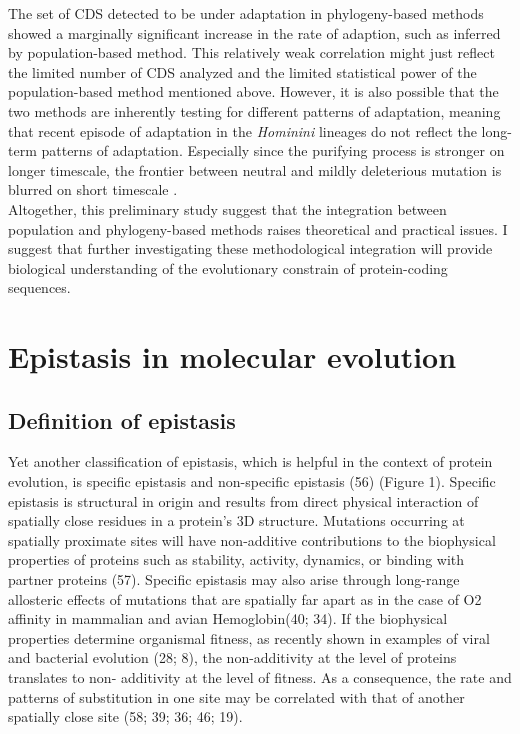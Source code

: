 The set of CDS detected to be under adaptation in phylogeny-based methods showed a marginally significant increase in the rate of adaption, such as inferred by population-based method. This relatively weak correlation might just reflect the limited number of CDS analyzed and the limited statistical power of the population-based method mentioned above. However, it is also possible that the two methods are inherently testing for different patterns of adaptation, meaning that recent episode of adaptation in the \textit{Hominini} lineages do not reflect the long-term patterns of adaptation. Especially since the purifying process is stronger on longer timescale, the frontier between neutral and mildly deleterious mutation is blurred on short timescale \citet{ho_time_2005}. \\

Altogether, this preliminary study suggest that the integration between population and phylogeny-based methods raises theoretical and practical issues. I suggest that further investigating these methodological integration will provide biological understanding of the evolutionary constrain of protein-coding sequences. \\


\section{Epistasis in molecular evolution}

\subsection{Definition of epistasis}

Yet another classification of epistasis, which is helpful in the context of protein evolution,
is specific epistasis and non-specific epistasis (56) (Figure 1). Specific epistasis is structural in origin and results from direct physical interaction of spatially close residues in a protein’s 3D structure. Mutations occurring at spatially proximate sites will have non-additive contributions to the biophysical properties of proteins such as stability, activity, dynamics, or binding with partner proteins (57). Specific epistasis may also arise through long-range allosteric effects of mutations that are spatially far apart as in the case of O2 affinity in mammalian and avian Hemoglobin(40; 34). If the biophysical properties determine organismal fitness, as recently shown in examples of viral and bacterial evolution (28; 8), the non-additivity at the level of proteins translates to non- additivity at the level of fitness. As a consequence, the rate and patterns of substitution in one site may be correlated with that of another spatially close site (58; 39; 36; 46; 19).

